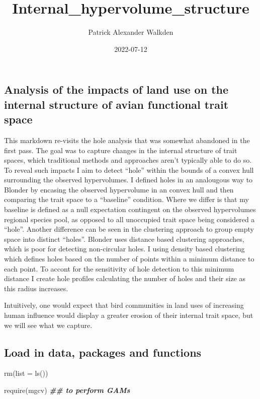 \documentclass[
]{article}
\title{Internal\_hypervolume\_structure}
\author{Patrick Alexander Walkden}
\date{2022-07-12}
\newenvironment{Shaded}{\begin{snugshade}}{\end{snugshade}}
\newcommand{\AttributeTok}[1]{\textcolor[rgb]{0.77,0.63,0.00}{#1}}
\newcommand{\DocumentationTok}[1]{\textcolor[rgb]{0.56,0.35,0.01}{\textbf{\textit{#1}}}}
\newcommand{\FunctionTok}[1]{\textcolor[rgb]{0.00,0.00,0.00}{#1}}
\newcommand{\NormalTok}[1]{#1}
\begin{document}
\maketitle

\hypertarget{analysis-of-the-impacts-of-land-use-on-the-internal-structure-of-avian-functional-trait-space}{%
\subsection{Analysis of the impacts of land use on the internal
structure of avian functional trait
space}\label{analysis-of-the-impacts-of-land-use-on-the-internal-structure-of-avian-functional-trait-space}}

This markdown re-visits the hole analysis that was somewhat abandoned in
the first pass. The goal was to capture changes in the internal
structure of trait spaces, which traditional methods and approaches
aren't typically able to do so. To reveal such impacts I aim to detect
``hole'' within the bounds of a convex hull surrounding the observed
hypervolumes. I defined holes in an analougous way to Blonder by
encasing the observed hypervolume in an convex hull and then comparing
the trait space to a ``baseline'' condition. Where we differ is that my
baseline is defined as a null expectation contingent on the observed
hypervolumes regional species pool, as opposed to all unoccupied trait
space being considered a ``hole''. Another difference can be seen in the
clustering approach to group empty space into distinct ``holes''.
Blonder uses distance based clustering approaches, which is poor for
detecting non-circular holes. I using density based clustering which
defines holes based on the number of points within a minimum distance to
each point. To accont for the sensitivity of hole detection to this
minimum distance I create hole profiles calculating the number of holes
and their size as this radius increases.

Intuitively, one would expect that bird communities in land uses of
increasing human influence would display a greater erosion of their
internal trait space, but we will see what we capture.

\hypertarget{load-in-data-packages-and-functions}{%
\subsection{Load in data, packages and
functions}\label{load-in-data-packages-and-functions}}

\begin{Shaded}
\begin{Highlighting}[]
\FunctionTok{rm}\NormalTok{(}\AttributeTok{list =} \FunctionTok{ls}\NormalTok{())}

\FunctionTok{require}\NormalTok{(mgcv) }\DocumentationTok{\#\# to perform GAMs}
\end{Highlighting}
\end{Shaded}
\end{document}

